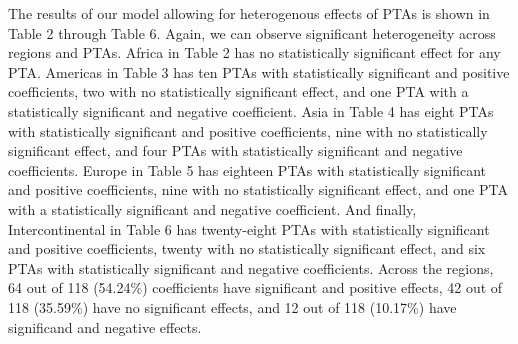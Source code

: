 The results of our model allowing for heterogenous effects of PTAs is
shown in Table 2 through Table 6. Again, we can observe significant
heterogeneity across regions and PTAs. Africa in Table 2 has no
statistically significant effect for any PTA. Americas in Table 3 has
ten PTAs with statistically significant and positive coefficients, two
with no statistically significant effect, and one PTA with a
statistically significant and negative coefficient. Asia in Table 4 has
eight PTAs with statistically significant and positive coefficients,
nine with no statistically significant effect, and four PTAs with
statistically significant and negative coefficients. Europe in Table 5
has eighteen PTAs with statistically significant and positive
coefficients, nine with no statistically significant effect, and one PTA
with a statistically significant and negative coefficient. And finally,
Intercontinental in Table 6 has twenty-eight PTAs with statistically
significant and positive coefficients, twenty with no statistically
significant effect, and six PTAs with statistically significant and
negative coefficients. Across the regions, 64 out of 118 (54.24\%)
coefficients have significant and positive effects, 42 out of 118
(35.59\%) have no significant effects, and 12 out of 118 (10.17\%) have
significand and negative effects.
